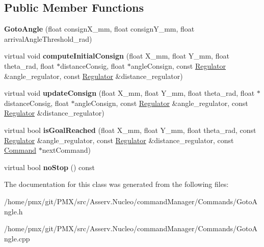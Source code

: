 \subsection*{Public Member Functions}
\begin{DoxyCompactItemize}
\item 
\mbox{\label{classGotoAngle_a0a041d5afc9546505e41f93b9747b683}} 
{\bfseries Goto\+Angle} (float consign\+X\+\_\+mm, float consign\+Y\+\_\+mm, float arrival\+Angle\+Threshold\+\_\+rad)
\item 
\mbox{\label{classGotoAngle_ab3f81bb348845f035cd31246d79a316e}} 
virtual void {\bfseries compute\+Initial\+Consign} (float X\+\_\+mm, float Y\+\_\+mm, float theta\+\_\+rad, float $\ast$distance\+Consig, float $\ast$angle\+Consign, const \hyperlink{classRegulator}{Regulator} \&angle\+\_\+regulator, const \hyperlink{classRegulator}{Regulator} \&distance\+\_\+regulator)
\item 
\mbox{\label{classGotoAngle_a9223a3694e0993dccfffbb3a6e1e6ed0}} 
virtual void {\bfseries update\+Consign} (float X\+\_\+mm, float Y\+\_\+mm, float theta\+\_\+rad, float $\ast$distance\+Consig, float $\ast$angle\+Consign, const \hyperlink{classRegulator}{Regulator} \&angle\+\_\+regulator, const \hyperlink{classRegulator}{Regulator} \&distance\+\_\+regulator)
\item 
\mbox{\label{classGotoAngle_a12dea7c689d1f5fb65b076cad8d78f4e}} 
virtual bool {\bfseries is\+Goal\+Reached} (float X\+\_\+mm, float Y\+\_\+mm, float theta\+\_\+rad, const \hyperlink{classRegulator}{Regulator} \&angle\+\_\+regulator, const \hyperlink{classRegulator}{Regulator} \&distance\+\_\+regulator, const \hyperlink{classCommand}{Command} $\ast$next\+Command)
\item 
\mbox{\label{classGotoAngle_ab3a0af6014dc1c209c4060ff039f7c8f}} 
virtual bool {\bfseries no\+Stop} () const
\end{DoxyCompactItemize}


The documentation for this class was generated from the following files\+:\begin{DoxyCompactItemize}
\item 
/home/pmx/git/\+P\+M\+X/src/\+Asserv.\+Nucleo/command\+Manager/\+Commands/Goto\+Angle.\+h\item 
/home/pmx/git/\+P\+M\+X/src/\+Asserv.\+Nucleo/command\+Manager/\+Commands/Goto\+Angle.\+cpp\end{DoxyCompactItemize}
